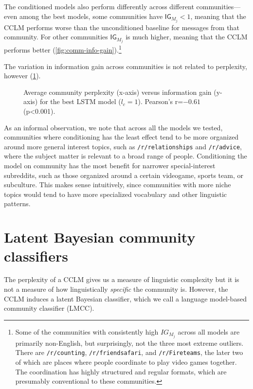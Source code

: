 \documentclass[11pt]{article}
\newcommand\Ppl{\mathsf{Ppl}}
\newcommand\IG{\mathsf{IG}}
\newcommand\subreddit[1]{\texttt{/r/#1}}
\begin{document}
The conditioned models also perform differently across different communities---%
even among the best models, some communities have $\IG_{M_j} < 1$,
meaning that the CCLM performs worse than the unconditioned baseline for 
messages from that community.
For other communities $\IG_{M_j}$ is much higher, meaning that the CCLM performs better  
(\cref{fig:comm-info-gain}).\footnote{
  Some of the communities with consistently high $IG_{M_j}$ 
  across all models are primarily non-English, 
  but surprisingly, not the three most extreme
  outliers. There are \subreddit{counting}, \subreddit{friendsafari}, and \subreddit{Fireteams}, 
  the later two of which are places where people coordinate to play video games
  together. The coordination has highly structured and regular formats, which 
  are presumably conventional to these communities.}

The variation in information gain across communities is not 
related to perplexity, however (\cref{fig:ppl-info-gain}).

\begin{figure}
\caption{
  Average community perplexity (x-axis) versus information gain (y-axis)
  for the best LSTM model ($l_c = 1$). Pearson's r=$-0.61$ (p<0.001).
}
\label{fig:ppl-info-gain}
\end{figure}

As an informal observation, we note that across all the models we
tested, communities where conditioning has the least effect tend to be
more organized around more general interest topics, such as 
\subreddit{relationships} and \subreddit{advice}, where the subject
matter is relevant to a broad range of people.  Conditioning the model
on community has the most benefit for narrower special-interest
subreddits, such as those organized around a certain videogame, sports
team, or subculture.  This makes sense intuitively, since communities
with more niche topics would tend to have more specialized vocabulary
and other linguistic patterns.

\section{Latent Bayesian community classifiers} \label{sec:lmcc}
The perplexity of a CCLM gives us a measure of linguistic complexity
but it is not a measure of how linguistically \emph{specific} the
community is. However, the CCLM induces a latent Bayesian classifier,
which we call a language model-based community classifier
(LMCC).
\end{document}
